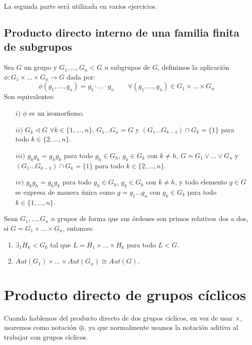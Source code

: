 La segunda parte será utilizada en varios ejercicios.

\subsection{Producto directo interno de una familia finita de subgrupos}
\begin{teo}
    Sea $G$ un grupo y $G_1,\ldots,G_n < G$ $n$ subgrupos de $G$, definimos la aplicación $\phi:G_1\times \ldots \times G_n\to G$ dada por:
    \begin{equation*}
        \phi(g_1,\ldots,g_n) = g_1\cdot \ldots \cdot g_n \qquad \forall (g_1,\ldots,g_n)\in G_1\times \ldots \times G_n
    \end{equation*}
    Son equivalentes:
    \begin{enumerate}
        \item[$i)$] $\phi$ es un isomorfismo.
        \item[$ii)$] $G_k\lhd G$ $\forall k\in \{1,\ldots,n\}$, $G_1\ldots G_n = G$ y $(G_1 \ldots G_{k-1}) \cap G_k = \{1\}$ para todo $k\in \{2,\ldots,n\}$.
        \item[$iii)$] $g_k g_h = g_h g_k$ para todo $g_h\in G_h$, $g_k\in G_k$ con $k\neq h$, $G = G_1\lor \ldots \lor G_n$ y $(G_1 \ldots G_{k-1}) \cap G_k = \{1\}$ para todo $k\in \{2,\ldots,n\}$.
        \item[$iv)$] $g_k g_h = g_h g_k$ para todo $g_h\in G_h$, $g_k\in G_k$ con $k\neq h$, y todo elemento $g\in G$ se expresa de manera única como $g= g_1\ldots g_n$ con $g_k \in G_k$ para todo $k \in \{1,\ldots,n\}$.
    \end{enumerate}
\end{teo}

\begin{teo}
    Sean $G_1,\ldots,G_n$ $n$ grupos de forma que sus órdenes son primos relativos dos a dos, si $G = G_1 \times \ldots \times G_n$, entonces:
    \begin{enumerate}
        \item $\exists_1 H_k < G_k$ tal que $L = H_1\times \ldots \times H_k$ para todo $L<G$.
        \item $Aut(G_1)\times \ldots \times Aut(G_n)\cong Aut(G)$.
    \end{enumerate}
\end{teo}

\section{Producto directo de grupos cíclicos}
\begin{notacion}
    Cuando hablemos del producto directo de dos grupos cíclicos, en vez de usar $\times$, usaremos como notación $\oplus$, ya que normalmente usamos la notación aditiva al trabajar con grupos cíclicos.
\end{notacion}

